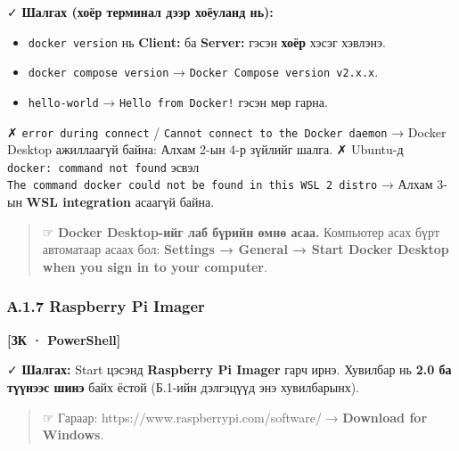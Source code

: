 ✓ \textbf{Шалгах (хоёр терминал дээр хоёуланд нь):}

\begin{itemize}
\tightlist
\item
  \texttt{docker\ version} нь \textbf{Client:} ба \textbf{Server:} гэсэн \textbf{хоёр} хэсэг хэвлэнэ.
\item
  \texttt{docker\ compose\ version} → \texttt{Docker\ Compose\ version\ v2.\allowbreak{}x.\allowbreak{}x}.
\item
  \texttt{hello-world} → \texttt{Hello\ from\ Docker!} гэсэн мөр гарна.
\end{itemize}

✗ \texttt{error\ during\ connect} / \texttt{Cannot\ connect\ to\ the\ Docker\ daemon} → Docker Desktop ажиллаагүй байна: Алхам 2-ын 4-р зүйлийг шалга.
✗ Ubuntu-д \texttt{docker:\allowbreak{}\ command\ not\ found} эсвэл \texttt{The\ command\ \textquotesingle{}docker\textquotesingle{}\ could\ not\ be\ found\ in\ this\ WSL\ 2\ distro} → Алхам 3-ын \textbf{WSL integration} асаагүй байна.

\begin{quote}
☞ \textbf{Docker Desktop-ийг лаб бүрийн өмнө асаа.} Компьютер асах бүрт автоматаар асаах бол: \textbf{Settings → General → Start Docker Desktop when you sign in to your computer}.
\end{quote}

\hypertarget{ux430.1.7-raspberry-pi-imager}{%
\subsubsection{А.1.7 Raspberry Pi Imager}\label{ux430.1.7-raspberry-pi-imager}}

\textbf{{[}ЗК · PowerShell{]}}

\begin{Shaded}
\begin{Highlighting}[]
\end{Highlighting}
\end{Shaded}

✓ \textbf{Шалгах:} Start цэсэнд \textbf{Raspberry Pi Imager} гарч ирнэ. Хувилбар нь \textbf{2.0 ба түүнээс шинэ} байх ёстой (Б.1-ийн дэлгэцүүд энэ хувилбарынх).

\begin{quote}
☞ Гараар: https://www.raspberrypi.com/software/ → \textbf{Download for Windows}.
\end{quote}

